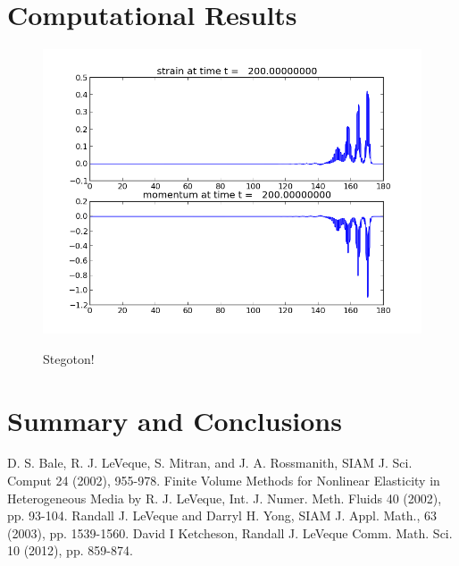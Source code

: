 \documentclass{article}
\begin{document}
\section{Computational Results}
\begin{figure}
  \centering
  \includegraphics[width=\textwidth]{frame0040fig1.png}\\
  \caption{Stegoton!}\label{stegoton}
\end{figure}


\section{Summary and Conclusions}




\begin{thebibliography}{9}
D. S. Bale, R. J. LeVeque, S. Mitran, and J. A. Rossmanith, SIAM J. Sci. Comput 24 (2002), 955-978.
Finite Volume Methods for Nonlinear Elasticity in Heterogeneous Media
by R. J. LeVeque, Int. J. Numer. Meth. Fluids 40 (2002), pp. 93-104.
Randall J. LeVeque and Darryl H. Yong, SIAM J. Appl. Math., 63 (2003), pp. 1539-1560.
David I Ketcheson, Randall J. LeVeque Comm. Math. Sci. 10 (2012), pp. 859-874.

\end{thebibliography}
\end{document}
